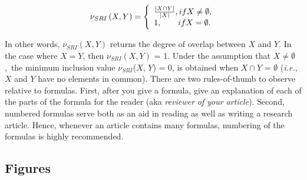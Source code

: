 \documentclass{llncs}
\begin{document}
\begin{equation}
\label{eqn:RI}
\nu _{SRI} \left( {X,Y} \right) = \left\{
 \begin{array}{l}
 \frac{{\left| {X \cap Y} \right|}}{{\left| X \right|}},if X \ne \emptyset,  \\
 1, \hspace{7mm} if X = \emptyset .
 \end{array} \right.
\end{equation}


%
%

\noindent In other words, $\nu_{SRI}\left(X,Y\right)$ returns  the
degree of overlap between $X$ and $Y$.  In the case where $X =   Y$,
then $\nu_{SRI}\left(X, Y\right)$ = 1.  Under the assumption that
$X\neq \emptyset$,~the minimum inclusion value $\nu_{SRI}$($X$, $Y$)
= 0,  is obtained when $X  \cap  Y$ = $\emptyset $ ({\em i.e.}, $X$ and
$Y$ have no elements in common).   There are two rules-of-thumb to
observe relative to formulas.  First, after you give a formula, give
an explanation of each of the parts of the formula for the reader
(aka \textit{reviewer of your article}).  Second, numbered formulas
serve both as an aid in reading as well as writing a research
article.  Hence, whenever an article contains many formulas,
numbering of the formulas is highly recommended.

\subsection{Figures}
\end{document}
